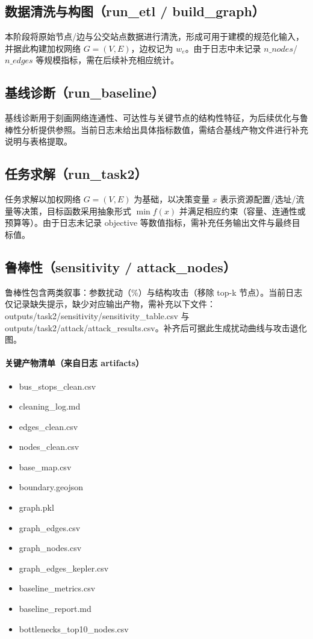 \subsection{数据清洗与构图（run\_etl / build\_graph）}
本阶段将原始节点/边与公交站点数据进行清洗，形成可用于建模的规范化输入，并据此构建加权网络 $G=(V,E)$，边权记为 $w_e$。由于日志中未记录 $n\_nodes$/$n\_edges$ 等规模指标，需在后续补充相应统计。

\subsection{基线诊断（run\_baseline）}
基线诊断用于刻画网络连通性、可达性与关键节点的结构性特征，为后续优化与鲁棒性分析提供参照。当前日志未给出具体指标数值，需结合基线产物文件进行补充说明与表格提取。

\subsection{任务求解（run\_task2）}
任务求解以加权网络 $G=(V,E)$ 为基础，以决策变量 $x$ 表示资源配置/选址/流量等决策，目标函数采用抽象形式 $\min f(x)$ 并满足相应约束（容量、连通性或预算等）。由于日志未记录 objective 等数值指标，需补充任务输出文件与最终目标值。

\subsection{鲁棒性（sensitivity / attack\_nodes）}
鲁棒性包含两类叙事：参数扰动（\%）与结构攻击（移除 top-k 节点）。当前日志仅记录缺失提示，缺少对应输出产物，需补充以下文件：outputs/task2/sensitivity/sensitivity\_table.csv 与 outputs/task2/attack/attack\_results.csv。补齐后可据此生成扰动曲线与攻击退化图。

\paragraph{关键产物清单（来自日志 artifacts）}
\begin{itemize}
  \item bus\_stops\_clean.csv
  \item cleaning\_log.md
  \item edges\_clean.csv
  \item nodes\_clean.csv
  \item base\_map.csv
  \item boundary.geojson
  \item graph.pkl
  \item graph\_edges.csv
  \item graph\_nodes.csv
  \item graph\_edges\_kepler.csv
  \item baseline\_metrics.csv
  \item baseline\_report.md
  \item bottlenecks\_top10\_nodes.csv
\end{itemize}
